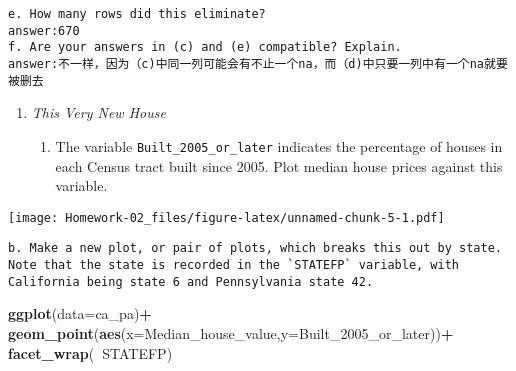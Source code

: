 \documentclass[
]{article}
\newenvironment{Shaded}{\begin{snugshade}}{\end{snugshade}}
\newcommand{\DataTypeTok}[1]{\textcolor[rgb]{0.13,0.29,0.53}{#1}}
\newcommand{\DecValTok}[1]{\textcolor[rgb]{0.00,0.00,0.81}{#1}}
\newcommand{\KeywordTok}[1]{\textcolor[rgb]{0.13,0.29,0.53}{\textbf{#1}}}
\newcommand{\NormalTok}[1]{#1}
\newcommand{\OperatorTok}[1]{\textcolor[rgb]{0.81,0.36,0.00}{\textbf{#1}}}
\newcommand{\StringTok}[1]{\textcolor[rgb]{0.31,0.60,0.02}{#1}}
\providecommand{\tightlist}{%
  \setlength{\itemsep}{0pt}\setlength{\parskip}{0pt}}
\begin{document}
\begin{verbatim}
e. How many rows did this eliminate?
answer:670
f. Are your answers in (c) and (e) compatible? Explain.
answer:不一样，因为（c)中同一列可能会有不止一个na，而（d)中只要一列中有一个na就要被删去
\end{verbatim}

\begin{enumerate}
\def\labelenumi{\arabic{enumi}.}
\setcounter{enumi}{1}
\tightlist
\item
  \emph{This Very New House}

  \begin{enumerate}
  \def\labelenumii{\alph{enumii}.}
  \tightlist
  \item
    The variable \texttt{Built\_2005\_or\_later} indicates the
    percentage of houses in each Census tract built since 2005. Plot
    median house prices against this variable.
  \end{enumerate}
\end{enumerate}

\begin{Shaded}
\end{Shaded}

\texttt{[image: Homework-02\_files/figure-latex/unnamed-chunk-5-1.pdf]}

\begin{verbatim}
b. Make a new plot, or pair of plots, which breaks this out by state.  Note that the state is recorded in the `STATEFP` variable, with California being state 6 and Pennsylvania state 42.
\end{verbatim}

\begin{Shaded}
\begin{Highlighting}[]
\KeywordTok{ggplot}\NormalTok{(}\DataTypeTok{data=}\NormalTok{ca_pa)}\OperatorTok{+}
\StringTok{  }\KeywordTok{geom_point}\NormalTok{(}\KeywordTok{aes}\NormalTok{(}\DataTypeTok{x=}\NormalTok{Median_house_value,}\DataTypeTok{y=}\NormalTok{Built_}\DecValTok{2005}\NormalTok{_or_later))}\OperatorTok{+}
\StringTok{  }\KeywordTok{facet_wrap}\NormalTok{(}\OperatorTok{~}\NormalTok{STATEFP)}
\end{Highlighting}
\end{Shaded}
\end{document}
